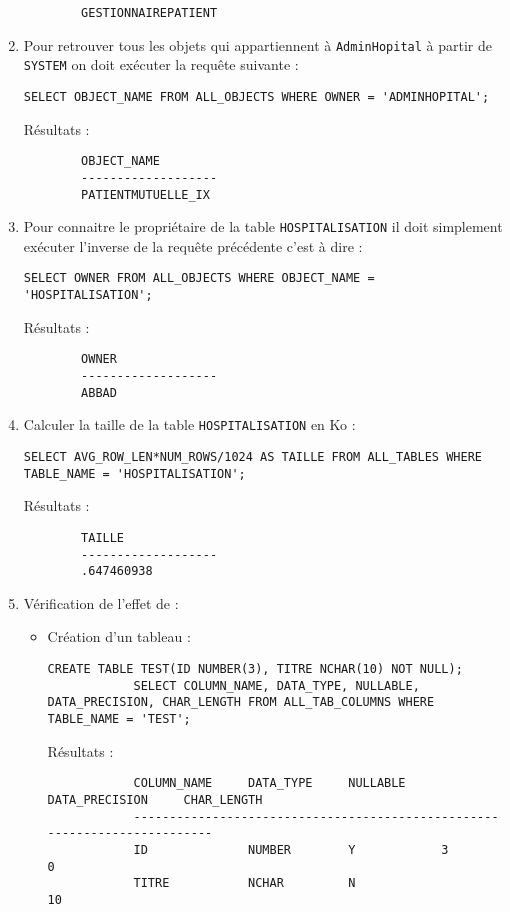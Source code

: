\documentclass[12pt,a4paper]{article}
\begin{document}
\begin{enumerate}
\begin{verbatim}
		GESTIONNAIREPATIENT
	\end{verbatim}
	\item Pour retrouver tous les objets qui appartiennent à \texttt{AdminHopital} à partir de \texttt{SYSTEM} on doit
	exécuter la requête suivante :
	\begin{lstlisting}[style=OracleSQL]
		SELECT OBJECT_NAME FROM ALL_OBJECTS WHERE OWNER = 'ADMINHOPITAL';
	\end{lstlisting}
	Résultats :
	\begin{verbatim}
		OBJECT_NAME
		-------------------
		PATIENTMUTUELLE_IX
	\end{verbatim}
	\item Pour connaitre le propriétaire de la table \texttt{HOSPITALISATION} il doit simplement exécuter l'inverse de la
	requête précédente c'est à dire :
	\begin{lstlisting}[style=OracleSQL]
		SELECT OWNER FROM ALL_OBJECTS WHERE OBJECT_NAME = 'HOSPITALISATION';
	\end{lstlisting}
	Résultats :
	\begin{verbatim}
		OWNER
		-------------------
		ABBAD
	\end{verbatim}
	\item Calculer la taille de la table \texttt{HOSPITALISATION} en Ko :
	\begin{lstlisting}[style=OracleSQL]
		SELECT AVG_ROW_LEN*NUM_ROWS/1024 AS TAILLE FROM ALL_TABLES WHERE TABLE_NAME = 'HOSPITALISATION';
	\end{lstlisting}
	Résultats :
	\begin{verbatim}
		TAILLE
		-------------------
		.647460938
	\end{verbatim}
	\item Vérification de l'effet de :
	\begin{itemize}
		\item Création d'un tableau :
		\begin{lstlisting}[style=OracleSQL]
			CREATE TABLE TEST(ID NUMBER(3), TITRE NCHAR(10) NOT NULL);
			SELECT COLUMN_NAME, DATA_TYPE, NULLABLE, DATA_PRECISION, CHAR_LENGTH FROM ALL_TAB_COLUMNS WHERE TABLE_NAME = 'TEST';
		\end{lstlisting}
		Résultats :
		\begin{verbatim}
			COLUMN_NAME     DATA_TYPE     NULLABLE     DATA_PRECISION     CHAR_LENGTH
			--------------------------------------------------------------------------
			ID              NUMBER        Y            3                  0
			TITRE           NCHAR         N                               10

\end{verbatim}
\end{itemize}
\end{enumerate}
\end{document}
